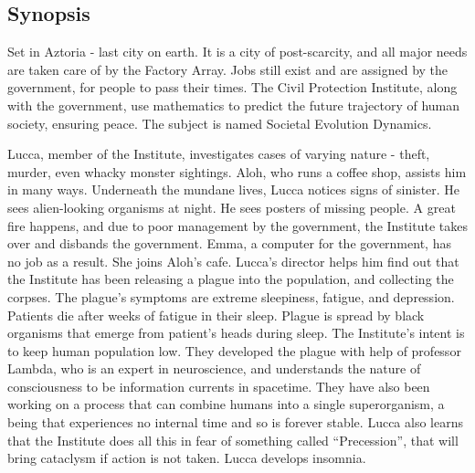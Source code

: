 \documentclass[11pt]{article}
\begin{document}
	\subsection{Synopsis}
	Set in Aztoria - last city on earth. 
	It is a city of post-scarcity, and all major needs are taken care of by the Factory Array.
	Jobs still exist and are assigned by the government, for people to pass their times.
	The Civil Protection Institute, along with the government, use mathematics to predict the future trajectory of human society, ensuring peace.
	The subject is named Societal Evolution Dynamics.
	
	Lucca, member of the Institute, investigates cases of varying nature - theft, murder, even whacky monster sightings.
	Aloh, who runs a coffee shop, assists him in many ways.
	Underneath the mundane lives, Lucca notices signs of sinister. 
	He sees alien-looking organisms at night. 
	He sees posters of missing people. 
	A great fire happens, and due to poor management by the government, the Institute takes over and disbands the government. 
	Emma, a computer for the government, has no job as a result.
	She joins Aloh's cafe.
	Lucca's director helps him find out that the Institute has been releasing a plague into the population, and collecting the corpses. 
	The plague's symptoms are extreme sleepiness, fatigue, and depression.
	Patients die after weeks of fatigue in their sleep.
	Plague is spread by black organisms that emerge from patient's heads during sleep.
	The Institute's intent is to keep human population low. 
	They developed the plague with help of professor Lambda, who is an expert in neuroscience, and understands the nature of consciousness to be information currents in spacetime.
	They have also been working on a process that can combine humans into a single superorganism, a being that experiences no internal time and so is forever stable.
	Lucca also learns that the Institute does all this in fear of something called ``Precession'', that will bring cataclysm if action is not taken.
	Lucca develops insomnia.
	
\end{document}
